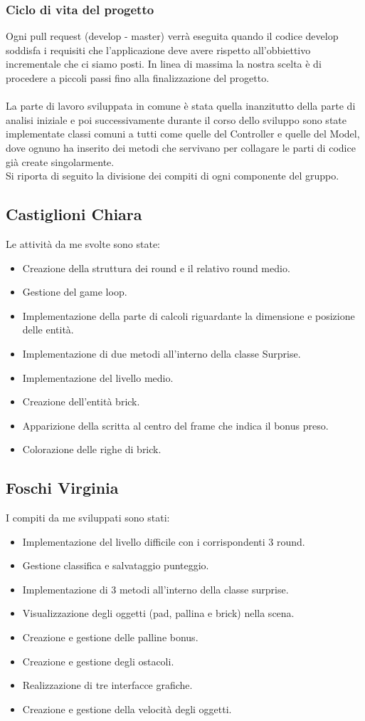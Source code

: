 \documentclass[a4paper,12pt]{report}
\begin{document}
\subsubsection{Ciclo di vita del progetto}
Ogni pull request (develop - master) verrà eseguita quando il codice develop soddisfa i requisiti che l'applicazione deve avere rispetto
all'obbiettivo incrementale che ci siamo posti.
In linea di massima la nostra scelta è di procedere a piccoli passi fino alla finalizzazione del progetto.\\
\\La parte di lavoro sviluppata in comune è stata quella inanzitutto della parte di analisi iniziale e poi successivamente durante il corso dello sviluppo
sono state implementate classi comuni a tutti come quelle del Controller e quelle del Model, dove ognuno ha inserito dei metodi che servivano per collagare
le parti di codice già create singolarmente.
\\Si riporta di seguito la divisione dei compiti di ogni componente del gruppo.
\subsection{Castiglioni Chiara}
Le attività da me svolte sono state:
\begin{itemize}
    \item Creazione della struttura dei round e il relativo round medio.
    \item Gestione del game loop.
    \item Implementazione della parte di calcoli riguardante la dimensione e posizione delle entità.
    \item Implementazione di due metodi all'interno della classe Surprise.
    \item Implementazione del livello medio.
    \item Creazione dell'entità brick.
    \item Apparizione della scritta al centro del frame che indica il bonus preso.
    \item Colorazione delle righe di brick.
\end{itemize}
\subsection{Foschi Virginia}
I compiti da me sviluppati sono stati:
\begin{itemize}
    \item Implementazione del livello difficile con i corrispondenti 3 round.
    \item Gestione classifica e salvataggio punteggio.
    \item Implementazione di 3 metodi all'interno della classe surprise.
    \item Visualizzazione degli oggetti (pad, pallina e brick) nella scena.
    \item Creazione e gestione delle palline bonus.
    \item Creazione e gestione degli ostacoli.
    \item Realizzazione di tre interfacce grafiche.
    \item Creazione e gestione della velocità degli oggetti.
\end{itemize}
\end{document}
